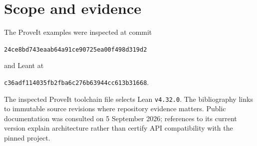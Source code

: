 \documentclass[11pt,a4paper]{article}
\theoremstyle{remark}
\newcommand{\ms}{\textsc{MathStep}}
\newcommand{\ty}[1]{\texttt{#1}}
\newcommand{\pv}{24ce8bd743eaab64a91ce90725ea00f498d319d2}
\newcommand{\lv}{c36adf114035fb2fba6c276b63944cc613b31668}
\begin{document}
\begin{abstract}
A useful mathematical proof is not a transcript of every operation needed to construct a term in dependent type theory. It is a structured account of the choices that make the argument work: the induction invariant, the right substitution, the relevant branch, the neighborhood on which an identity holds, or the lemma that reduces the problem. Much of the remaining formal text is reconstructible bookkeeping. But some apparently routine details are indispensable hypotheses, and hiding them carelessly changes the theorem.

This article proposes \ms, a proof language whose primary unit is a typed mathematical step rather than an individual tactic invocation. The design is grounded in four inspected ProveIt modules and in Leant's existing synthesis, translation, verification, and provenance boundaries. Worked examples cover differentiation of an algebraic branch, branch uniqueness, differentiation of identities on open sets, reflected dyadic indices and finite-sum substitution, and structural induction on formal derivations. The proposal combines declarative assertions, domain-specific methods with explicit proof obligations, a scoped obligation ledger, bounded synthesis, and frozen proof capsules. It specifies the relationship between source meaning, elaboration, kernel checking, axiom policy, and explanatory structure; gives a small core semantics and a conditional soundness argument; and develops a concrete Lean-hosted implementation and evaluation plan. Concision is treated as reduced authoring and maintenance effort, not as a contest to replace every proof by a single opaque command.
\end{abstract}

\section*{Scope and evidence}
The ProveIt examples were inspected at commit
\begin{center}\small\texttt{\pv}\end{center}
and Leant at
\begin{center}\small\texttt{\lv}.\end{center}
The inspected ProveIt toolchain file selects Lean \ty{v4.32.0}. The bibliography links to immutable source revisions where repository evidence matters. Public documentation was consulted on 5 September 2026; references to its current version explain architecture rather than certify API compatibility with the pinned project.\cite{proveit-toolchain,lean-elaboration}
\end{document}
